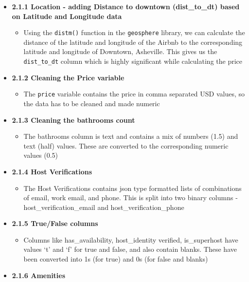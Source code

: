 \documentclass[
  letterpaper,
  DIV=11,
  numbers=noendperiod]{scrartcl}
\providecommand{\tightlist}{%
  \setlength{\itemsep}{0pt}\setlength{\parskip}{0pt}}\usepackage{longtable,booktabs,array}
\begin{document}
\begin{itemize}
\tightlist
\item
  \textbf{2.1.1 Location - adding Distance to downtown (dist\_to\_dt)
  based on Latitude and Longitude data}

  \begin{itemize}
  \tightlist
  \item
    Using the \texttt{distm()} function in the \texttt{geosphere}
    library, we can calculate the distance of the latitude and longitude
    of the Airbnb to the corresponding latitude and longitude of
    Downtown, Asheville. This gives us the \texttt{dist\_to\_dt} column
    which is highly significant while calculating the price
  \end{itemize}
\item
  \textbf{2.1.2 Cleaning the Price variable}

  \begin{itemize}
  \tightlist
  \item
    The \texttt{price} variable contains the price in comma separated
    USD values, so the data has to be cleaned and made numeric
  \end{itemize}
\item
  \textbf{2.1.3 Cleaning the bathrooms count}

  \begin{itemize}
  \tightlist
  \item
    The bathrooms column is text and contains a mix of numbers (1.5) and
    text (half) values. These are converted to the corresponding numeric
    values (0.5)
  \end{itemize}
\item
  \textbf{2.1.4 Host Verifications}

  \begin{itemize}
  \tightlist
  \item
    The Host Verifications contains json type formatted lists of
    combinations of email, work email, and phone. This is split into two
    binary columns - host\_verification\_email and
    host\_verification\_phone
  \end{itemize}
\item
  \textbf{2.1.5 True/False columns}

  \begin{itemize}
  \tightlist
  \item
    Columns like has\_availability, host\_identity verified,
    is\_superhost have values `t' and `f' for true and false, and also
    contain blanks. These have been converted into 1s (for true) and 0s
    (for false and blanks)
  \end{itemize}
\item
  \textbf{2.1.6 Amenities}


\end{itemize}
\end{document}
